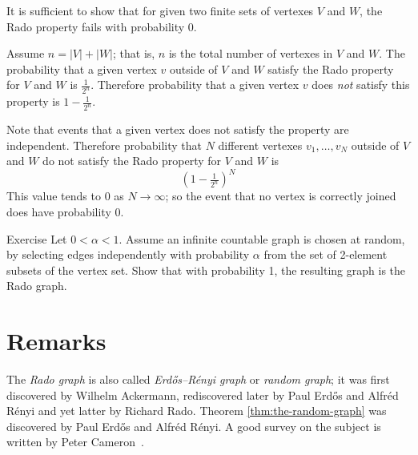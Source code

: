 It is sufficient to show that for given two finite sets of vertexes $V$ and $W$, the Rado property fails with probability 0.

Assume $n=|V|+|W|$; that is, $n$ is the total number of vertexes in $V$ and $W$.
The probability that a given vertex $v$ outside of $V$ and $W$ satisfy the Rado property for $V$ and $W$
is $\tfrac1{2^n}$.
Therefore probability that a given vertex $v$ does {}\emph{not} satisfy this property
is $1-\tfrac1{2^n}$.

Note that events that a given vertex does not satisfy the property are independent.
Therefore probability that $N$ different vertexes $v_1,\dots,v_N$ outside of $V$ and $W$ do not satisfy the Rado property for $V$ and $W$ is 
\[(1-\tfrac1{2^n})^N\]
This value tends to 0 as $N \to \infty$; so the event that no vertex is correctly joined does have probability
0.
\qeds

\begin{thm}{Exercise}
Let $0<\alpha<1$.
Assume an infinite countable graph is chosen at random, by selecting edges independently with probability $\alpha$ from the set of 2-element subsets of the vertex set.
Show that with probability 1, the resulting graph is the Rado graph.
\end{thm}

\section*{Remarks}

The {}\emph{Rado graph} is also called \emph{Erd\H{o}s–R\'enyi graph} or \emph{random graph};
it was first discovered by Wilhelm Ackermann, rediscovered later by
Paul Erd\H{o}s and Alfr\'ed R\'enyi and yet latter by Richard Rado. 
Theorem \ref{thm:the-random-graph} was discovered by Paul Erd\H{o}s and Alfr\'ed R\'enyi.
A good survey on the subject is written by Peter Cameron~\cite{cameron}.


